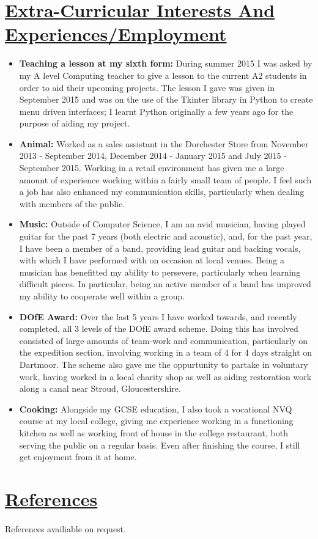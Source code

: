 \documentclass[11pt]{article}
\begin{document}
	\vspace{-3pt}
	\hspace{-100pt}\section*{\underline{Extra-Curricular Interests And Experiences/Employment}}
			\begin{itemize}
				\item \textbf{Teaching a lesson at my sixth form:} During summer 2015 I was asked by my A level Computing teacher to give a lesson to the current A2 students in order to aid their upcoming projects. The lesson I gave was given in September 2015 and was on the use of the Tkinter library in Python to create menu driven interfaces; I learnt Python originally a few years ago for the purpose of aiding my project.
				\item \textbf{Animal:} Worked as a sales assistant in the Dorchester Store from November 2013 - September 2014, December 2014 - January 2015 and July 2015 - September 2015. Working in a retail environment has given me a large amount of experience working within a fairly small team of people. I feel such a job has also enhanced my communication skills, particularly when dealing with members of the public. 
				\item \textbf{Music:} Outside of Computer Science, I am an avid musician, having played guitar for the past 7 years (both electric and acoustic), and, for the past year, I have been a member of a band, providing lead guitar and backing vocals, with which I have performed with on occasion at local venues. Being a musician has benefitted my ability to persevere, particularly when learning difficult pieces. In particular, being an active member of a band has improved my ability to cooperate well within a group. 
				\item \textbf{DOfE Award:} Over the last 5 years I have worked towards, and recently completed, all 3 levels of the DOfE award scheme. Doing this has involved consisted of large amounts of team-work and communication, particularly on the expedition section, involving working in a team of 4 for 4 days straight on Dartmoor. The scheme also gave me the oppurtunity to partake in voluntary work, having worked in a local charity shop as well as aiding restoration work along a canal near Stroud, Gloucestershire.
				\item \textbf{Cooking:} Alongside my GCSE education, I also took a vocational NVQ course at my local college, giving me experience working in a functioning kitchen as well as working front of house in the college restaurant, both serving the public on a regular basis. Even after finishing the course, I still get enjoyment from it at home.
			\end{itemize}
				
	\vspace{-3pt}
	\hspace{-100pt}\section*{\underline{References}}
			\paragraph{}
				References availiable on request.
				
\end{document}
